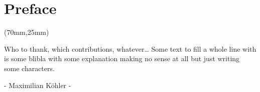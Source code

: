 
\begingroup

\chapter*{Preface}

\thispagestyle{empty}

\begin{textblock*}{.7\textwidth}(70mm,25mm)
    \prefacelogo
\end{textblock*}

Who to thank, which contributions, whatever\dots
Some text to fill a whole line with is some blibla with some explanation making no sense at all but just writing some characters.

\begin{center}
    - Maximilian Köhler -
\end{center}

\endgroup